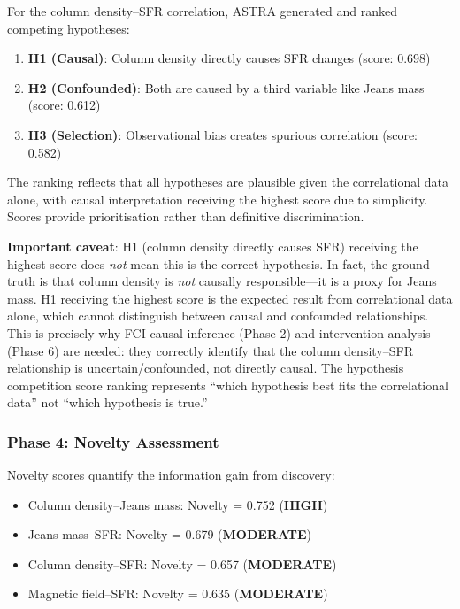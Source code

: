 \documentclass[usenatbib]{rasti}
\begin{document}
For the column density--SFR correlation, ASTRA generated and ranked competing hypotheses:

\begin{enumerate}
\item \textbf{H1 (Causal)}: Column density directly causes SFR changes (score: 0.698)
\item \textbf{H2 (Confounded)}: Both are caused by a third variable like Jeans mass (score: 0.612)
\item \textbf{H3 (Selection)}: Observational bias creates spurious correlation (score: 0.582)
\end{enumerate}

The ranking reflects that all hypotheses are plausible given the correlational data alone, with causal interpretation receiving the highest score due to simplicity. Scores provide prioritisation rather than definitive discrimination.

\textbf{Important caveat}: H1 (column density directly causes SFR) receiving the highest score does \textit{not} mean this is the correct hypothesis. In fact, the ground truth is that column density is \textit{not} causally responsible---it is a proxy for Jeans mass. H1 receiving the highest score is the expected result from correlational data alone, which cannot distinguish between causal and confounded relationships. This is precisely why FCI causal inference (Phase 2) and intervention analysis (Phase 6) are needed: they correctly identify that the column density--SFR relationship is uncertain/confounded, not directly causal. The hypothesis competition score ranking represents ``which hypothesis best fits the correlational data'' not ``which hypothesis is true.''

\subsubsection{Phase 4: Novelty Assessment}

Novelty scores quantify the information gain from discovery:

\begin{itemize}
\item Column density--Jeans mass: Novelty = 0.752 (\textbf{HIGH})
\item Jeans mass--SFR: Novelty = 0.679 (\textbf{MODERATE})
\item Column density--SFR: Novelty = 0.657 (\textbf{MODERATE})
\item Magnetic field--SFR: Novelty = 0.635 (\textbf{MODERATE})
\end{itemize}
\end{document}
